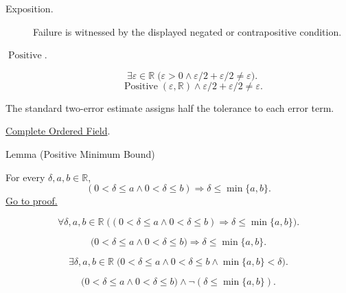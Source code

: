 \begin{remark*}
\begin{description}
  \item[Exposition.]
  Failure is witnessed by the displayed negated or contrapositive condition.

  \item[\(\operatorname{Positive}.\)]
  \[
\exists\varepsilon\in\mathbb{R}\;\bigl(\varepsilon>0\land
\varepsilon/2+\varepsilon/2\ne\varepsilon\bigr).
\]
\[
\operatorname{Positive}(\varepsilon,\mathbb{R})\land
\varepsilon/2+\varepsilon/2\ne\varepsilon.
\]
\end{description}
\end{remark*}
\begin{remark*}[Interpretation]
The standard two-error estimate assigns half the tolerance to each error term.
\end{remark*}
\begin{dependencies}
\hyperref[def:real-ordered-field]{Complete Ordered Field}.
\end{dependencies}


\begin{lemmabox}{Lemma (Positive Minimum Bound)}
\begin{lemma}
\label{lem:positive-minimum-bound}
For every $\delta,a,b\in\mathbb{R}$,
\[
  (0<\delta\leq a\land 0<\delta\leq b)
  \Longrightarrow
  \delta\leq \min\{a,b\}.
\]
\hyperref[prf:positive-minimum-bound]{Go to proof.}
\end{lemma}
\end{lemmabox}
\begin{remark*}
\[
\forall \delta,a,b\in\mathbb{R}\;
\bigl((0<\delta\leq a\land 0<\delta\leq b)\Longrightarrow
\delta\leq \min\{a,b\}\bigr).
\]
\end{remark*}
\begin{remark*}
\[
\bigl(0<\delta\leq a\land 0<\delta\leq b\bigr)
\Longrightarrow \delta\leq\min\{a,b\}.
\]
\end{remark*}
\begin{remark*}
\[
\exists \delta,a,b\in\mathbb{R}\;
\bigl(0<\delta\leq a\land 0<\delta\leq b\land \min\{a,b\}<\delta\bigr).
\]
\end{remark*}
\begin{remark*}
\[
\bigl(0<\delta\leq a\land 0<\delta\leq b\bigr)\land
\neg(\delta\leq\min\{a,b\}).
\]
\end{remark*}

